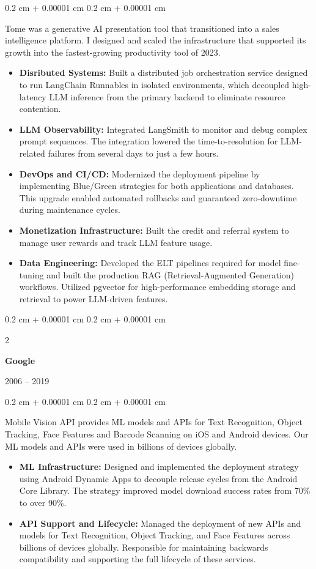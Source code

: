 \documentclass[12pt, letterpaper]{article}
\newenvironment{highlights}{
    \begin{itemize}[
        topsep=0.10 cm,
        parsep=0.10 cm,
        partopsep=0pt,
        itemsep=0pt,
        leftmargin=0.4 cm + 10pt
    ]
}{
    \end{itemize}
} %
\newenvironment{onecolentry}{
    \begin{adjustwidth}{
        0.2 cm + 0.00001 cm
    }{
        0.2 cm + 0.00001 cm
    }
}{
    \end{adjustwidth}
} %
\newenvironment{twocolentry}[2][]{
    \onecolentry
    \def\secondColumn{#2}
    \setcolumnwidth{\fill, 4.5 cm}
    \begin{paracol}{2}
}{
    \switchcolumn \raggedleft \secondColumn
    \end{paracol}
    \endonecolentry
} %
\begin{document}
\vspace{0.10 cm}
\begin{onecolentry}
	Tome was a generative AI presentation tool that transitioned into a sales intelligence platform. I designed and scaled the infrastructure that supported its growth into the fastest-growing productivity tool of 2023.
	\begin{highlights}
		\item \textbf{Disributed Systems:} Built a distributed job orchestration service designed to run LangChain Runnables in isolated environments, which decoupled high-latency LLM inference from the primary backend to eliminate resource contention.
		\item \textbf{LLM Observability:} Integrated LangSmith to monitor and debug complex prompt sequences. The integration lowered the time-to-resolution for LLM-related failures from several days to just a few hours.
		\item \textbf{DevOps and CI/CD:} Modernized the deployment pipeline by implementing Blue/Green strategies for both applications and databases. This upgrade enabled automated rollbacks and guaranteed zero-downtime during maintenance cycles.
		\item \textbf{Monetization Infrastructure:} Built the credit and referral system to manage user rewards and track LLM feature usage.
		\item \textbf{Data Engineering:} Developed the ELT pipelines required for model fine-tuning and built the production RAG (Retrieval-Augmented Generation) workflows. Utilized pgvector for high-performance embedding storage and retrieval to power LLM-driven features.
	\end{highlights}
\end{onecolentry}

\vspace{0.2 cm}

\begin{twocolentry}{
		{\color{gray}2006 – 2019}}
	\textbf{Google}
\end{twocolentry}

\vspace{0.10 cm}

\begin{onecolentry}
	Mobile Vision API provides ML models and APIs for Text Recognition, Object Tracking, Face Features and Barcode Scanning on iOS and Android devices. Our ML models and APIs were used in billions of devices globally.
	\begin{highlights}
		\item \textbf{ML Infrastructure:} Designed and implemented the deployment strategy using Android Dynamic Apps to decouple release cycles from the Android Core Library. The strategy improved model download success rates from 70\% to over 90\%.
		\item \textbf{API Support and Lifecycle:} Managed the deployment of new APIs and models for Text Recognition, Object Tracking, and Face Features across billions of devices globally. Responsible for maintaining backwards compatibility and supporting the full lifecycle of these services.
	\end{highlights}
\end{onecolentry}
\end{document}
